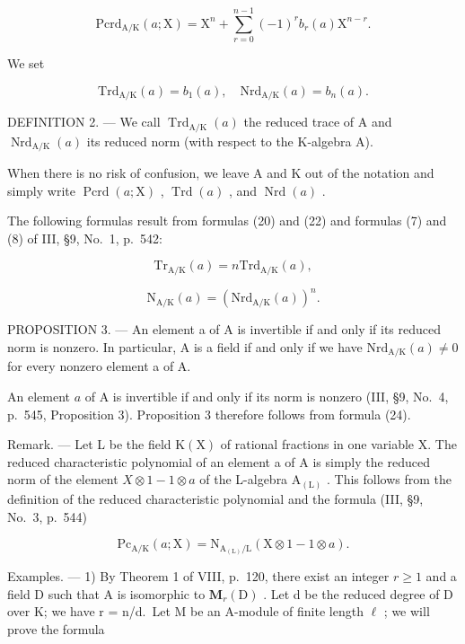 \[
\mathrm{Pcrd} _ {\mathrm{A/K}} (a; \mathrm{X}) = \mathrm{X} ^ {n} + \sum_ {r = 0} ^ {n - 1} (- 1) ^ {r} b _ {r} (a) \mathrm{X} ^ {n - r}.\tag{21}
\]

We set

\[
\mathrm{Trd} _ {\mathrm{A/K}} (a) = b _ {1} (a), \quad \mathrm{Nrd} _ {\mathrm{A/K}} (a) = b _ {n} (a).\tag{22}
\]

DEFINITION 2. --- We call \(\operatorname{Trd}_{\mathrm{A/K}}(a)\) the reduced trace of A and \(\operatorname{Nrd}_{\mathrm{A/K}}(a)\) its reduced norm (with respect to the K-algebra A).

When there is no risk of confusion, we leave A and K out of the notation and simply write \(\operatorname{Pcrd}(a; \mathrm{X})\) , \(\operatorname{Trd}(a)\) , and \(\operatorname{Nrd}(a)\) .

The following formulas result from formulas (20) and (22) and formulas (7) and (8) of III, §9, No.~1, p.~542:

\[
\mathrm{Tr} _ {\mathrm{A/K}} (a) = n \mathrm{Trd} _ {\mathrm{A/K}} (a),\tag{23}
\]

\[
\mathrm{N} _ {\mathrm{A/K}} (a) = (\mathrm{Nrd} _ {\mathrm{A/K}} (a)) ^ {n}.\tag{24}
\]

PROPOSITION 3. --- An element a of A is invertible if and only if its reduced norm is nonzero. In particular, A is a field if and only if we have \(\mathrm{Nrd}_{\mathrm{A}/\mathrm{K}}(a) \neq 0\) for every nonzero element a of A.

An element \(a\) of A is invertible if and only if its norm is nonzero (III, §9, No.~4, p.~545, Proposition 3). Proposition 3 therefore follows from formula (24).

Remark. --- Let L be the field \(\mathrm{K}(\mathrm{X})\) of rational fractions in one variable X. The reduced characteristic polynomial of an element a of A is simply the reduced norm of the element \(X \otimes 1 - 1 \otimes a\) of the L-algebra \(\mathrm{A}_{(\mathrm{L})}\) . This follows from the definition of the reduced characteristic polynomial and the formula (III, §9, No.~3, p.~544)

\[
\mathrm{Pc} _ {\mathrm{A/K}} (a; \mathrm{X}) = \mathrm{N} _ {\mathrm{A} _ {(\mathrm{L})} / \mathrm{L}} (\mathrm{X} \otimes 1 - 1 \otimes a).\tag{25}
\]

Examples. --- 1) By Theorem 1 of VIII, p.~120, there exist an integer \(r \geqslant 1\) and a field D such that A is isomorphic to \(\mathbf{M}_{r}(\mathrm{D})\) . Let d be the reduced degree of D over K; we have r = n/d.~Let M be an A-module of finite length \(\ell\) ; we will prove the formula

